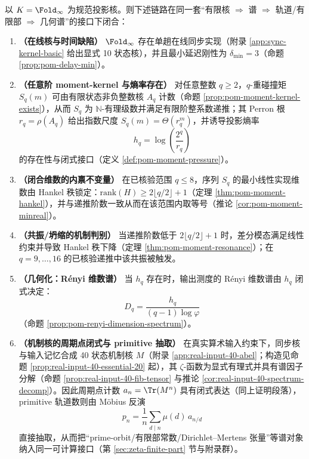 \begin{theorem}\label{thm:pom-unified-closure}
以 $K=\Fold_\infty$ 为规范投影核。则下述链路在同一套“有限核 $\Rightarrow$ 谱 $\Rightarrow$ 轨道/有限部 $\Rightarrow$ 几何谱”的接口下闭合：
\begin{enumerate}
  \item \textbf{（在线核与时间缺陷）} $\Fold_\infty$ 存在单趟在线同步实现（附录 \ref{app:sync-kernel-basic} 给出显式 10 状态核），并且最小延迟刚性为 $\delta_{\min}=3$（命题 \ref{prop:pom-delay-min}）。
  \item \textbf{（任意阶 moment-kernel 与熵率存在）} 对任意整数 $q\ge 2$，$q$-重碰撞矩 $S_q(m)$ 可由有限状态非负整数核 $A_q$ 计数（命题 \ref{prop:pom-moment-kernel-exists}），从而 $S_q$ 为 \(\mathbb N\)-有理级数并满足有限阶整系数递推；其 Perron 根 $r_q=\rho(A_q)$ 给出指数尺度 $S_q(m)=\Theta(r_q^m)$，并诱导投影熵率
  \[
  h_q=\log\!\left(\frac{2^q}{r_q}\right)
  \]
  的存在性与闭式接口（定义 \ref{def:pom-moment-pressure}）。
  \item \textbf{（闭合维数的内禀不变量）} 在已核验范围 $q\le 8$，序列 $S_q$ 的最小线性实现维数由 Hankel 秩锁定：\(\mathrm{rank}(H)\ge 2\lfloor q/2\rfloor+1\)（定理 \ref{thm:pom-moment-hankel}），并与递推阶数一致从而在该范围内取等号（推论 \ref{cor:pom-moment-minreal}）。
  \item \textbf{（共振/坍缩的机制判别）} 当递推阶数低于 \(2\lfloor q/2\rfloor+1\) 时，差分模态满足线性约束并导致 Hankel 秩下降（定理 \ref{thm:pom-moment-resonance}）；在 \(q=9,\dots,16\) 的已核验递推中该共振被触发。
  \item \textbf{（几何化：Rényi 维数谱）} 当 $h_q$ 存在时，输出测度的 Rényi 维数谱由 $h_q$ 闭式决定：
  \[
  D_q=\frac{h_q}{(q-1)\log\varphi}
  \]
  （命题 \ref{prop:pom-renyi-dimension-spectrum}）。
  \item \textbf{（机制核的周期点闭式与 primitive 抽取）} 在真实算术输入约束下，同步核与输入记忆合成 40 状态机制核 $M$（附录 \ref{app:real-input-40-abel}；构造见命题 \ref{prop:real-input-40-essential-20} 起），其 $\zeta$-函数为显式有理式并具有谱因子分解（命题 \ref{prop:real-input-40-fib-tensor} 与推论 \ref{cor:real-input-40-spectrum-decomp}）。因此周期点计数 $a_n=\Tr(M^n)$ 具有闭式表达（同上证明段落），primitive 轨道数则由 Möbius 反演
  \[
  p_n=\frac{1}{n}\sum_{d\mid n}\mu(d)\,a_{n/d}
  \]
  直接抽取，从而把“prime-orbit/有限部常数/Dirichlet--Mertens 张量”等谱对象纳入同一可计算接口（第 \ref{sec:zeta-finite-part} 节与附录群）。
\end{enumerate}
\end{theorem}

